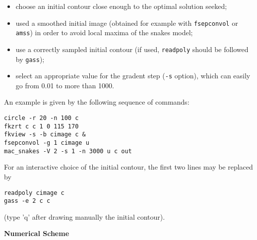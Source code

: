 \begin{itemize}
\item choose an initial contour close enough to the optimal solution seeked;
\item used a smoothed initial image (obtained for example with 
\verb+fsepconvol+ or \verb+amss+) in order to avoid local maxima
of the snakes model;
\item use a correctly sampled initial contour (if used, \verb+readpoly+ 
should be followed by \verb+gass+);
\item select an appropriate value for the gradent step (\verb+-s+ option),
which can easily go from 0.01 to more than 1000.
\end{itemize}

An example is given by the following sequence of commands:

\begin{verbatim}
circle -r 20 -n 100 c
fkzrt c c 1 0 115 170
fkview -s -b cimage c &
fsepconvol -g 1 cimage u
mac_snakes -V 2 -s 1 -n 3000 u c out
\end{verbatim}

For an interactive choice of the initial
contour, the first two lines may be replaced by 
\begin{verbatim}
readpoly cimage c
gass -e 2 c c
\end{verbatim}
(type 'q' after drawing manually the initial contour).

\newpage

\centerline {\bf \large Numerical Scheme}

\vskip 6mm

